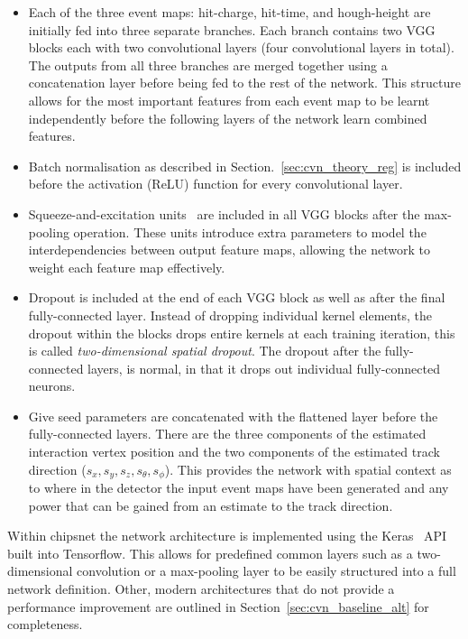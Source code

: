 \begin{itemize}
    \item Each of the three event maps: hit-charge, hit-time, and hough-height are initially fed
          into three separate branches. Each branch contains two VGG blocks each with two
          convolutional layers (four convolutional layers in total). The outputs from all three
          branches are merged together using a concatenation layer before being fed to the rest of
          the network. This structure allows for the most important features from each event map
          to be learnt independently before the following layers of the network learn combined
          features.

    \item Batch normalisation as described in Section.~\ref{sec:cvn_theory_reg} is included before
          the activation (ReLU) function for every convolutional layer.

    \item Squeeze-and-excitation units~\cite{hu2018} are included in all VGG blocks after the
          max-pooling operation. These units introduce extra parameters to model the
          interdependencies between output feature maps, allowing the network to weight each
          feature map effectively.

    \item Dropout is included at the end of each VGG block as well as after the final
          fully-connected layer. Instead of dropping individual kernel elements, the dropout
          within the blocks drops entire kernels at each training iteration, this is called
          \emph{two-dimensional spatial dropout}. The dropout after the fully-connected layers, is
          normal, in that it drops out individual fully-connected neurons.

    \item Give seed parameters are concatenated with the flattened layer before the
          fully-connected layers. There are the three components of the estimated interaction
          vertex position and the two components of the estimated track direction ($s_{x},s_{y},
              s_{z},s_{\theta},s_{\phi}$). This provides the network with spatial context as to where
          in the detector the input event maps have been generated and any power that can be
          gained from an estimate to the track direction.
\end{itemize}

Within chipsnet the network architecture is implemented using the Keras~\cite{chollet2015} API
built into Tensorflow. This allows for predefined common layers such as a two-dimensional
convolution or a max-pooling layer to be easily structured into a full network definition. Other,
modern architectures that do not provide a performance improvement are outlined in
Section~\ref{sec:cvn_baseline_alt} for completeness.

